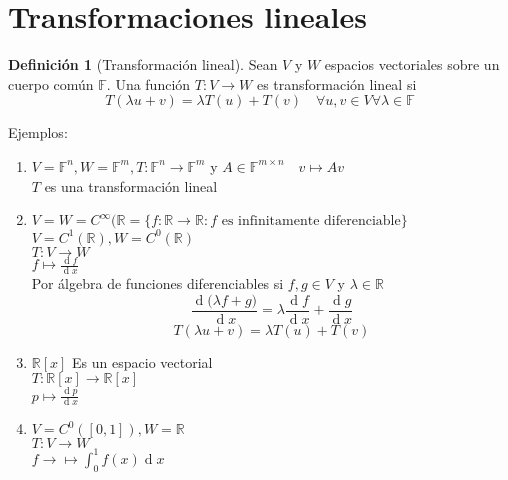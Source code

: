 \documentclass[11pt]{book}
\renewcommand{\d}[1]{\ensuremath{\operatorname{d}\!{#1}}}
\theoremstyle{definition}
\newtheorem{defn}{Definición}[section]
\begin{document}
\section{Transformaciones lineales}
\begin{defn}[Transformación lineal]
Sean $V$ y $W$ espacios vectoriales sobre un cuerpo común $\mathbb{F}$.
Una función $T:V\rightarrow W$ es transformación lineal si 
\[T(\lambda u+v)=\lambda T(u)+T(v)\quad \forall u,v\in V \forall\lambda\in\mathbb{F}
\]
\end{defn}
Ejemplos:
\begin{enumerate}
	\item $V=\mathbb{F}^n, W=\mathbb{F}^m, T:\mathbb{F}^n\rightarrow\mathbb{F}^m$ y $A\in\mathbb{F}^{m\times n}\quad v\mapsto Av$\\
	$T$ es una transformación lineal
	
	\item $V=W=C^\infty(\mathbb{R}=\{f:\mathbb{R}\rightarrow\mathbb{R}: f\textrm{ es infinitamente diferenciable}\}$\\
	$V=C^1(\mathbb{R}), W=C^0(\mathbb{R})$\\
	$T:V\rightarrow W$\\
	$f\mapsto\frac{\d f}{\d x}$\\
	Por álgebra de funciones diferenciables si $f,g\in V$ y $\lambda\in\mathbb{R}$
	\[
	\frac{\d (\lambda f+g)}{\d x}=\lambda\frac{\d f}{\d x}+\frac{\d g}{\d x}
	\]
	\[
	T(\lambda u+v)=\lambda T(u)+T(v)
	\]
	
	\item $\mathbb{R}[x]$ Es un espacio vectorial\\
	$T:\mathbb{R}[x]\rightarrow \mathbb{R}[x]$\\
	$p\mapsto\frac{\d p}{\d x}$
	
	\item $V=C^0([0,1]), W=\mathbb{R}$\\
	$T:V\rightarrow W$\\
	$f\rightarrow\mapsto\int^1_0f(x)\d x$
\end{enumerate}
\end{document}
